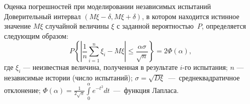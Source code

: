\documentclass{beamer}
\begin{document}
	\begin{frame} {Оценка погрешностей при моделировании независимых испытаний}
		Доверительный интервал $(M\xi - \delta, M\xi + \delta)$, в котором находится истинное значение $M\xi$ случайной величины $\xi$ %
		с заданной вероятностью~$P$, определяется следующим образом:
		\[
			P \left\{ \left| \frac{1}{n} \sum^n_{i=1} \xi_i - M\xi \right| 
			\leqslant  \frac{\alpha \sigma}{\sqrt{n}} \right\} 
			= 2 \varPhi(\alpha) 
			,
		\]
		где 
		$\xi_i$ --- неизвестная величина, полученная в результате $i$-го испытания; 
		$n$ --- независимые истории (число испытаний); 
		$\sigma = \sqrt{D \xi}$~---~среднеквадратичное отклонение; %
		$\varPhi (\alpha)= \frac{1}{2 \sqrt{\pi}}  \int \limits_{0}^{\alpha}  e^{-t^2} dt $~---~функция Лапласа.

	
	\end{frame}
	
\end{document}
